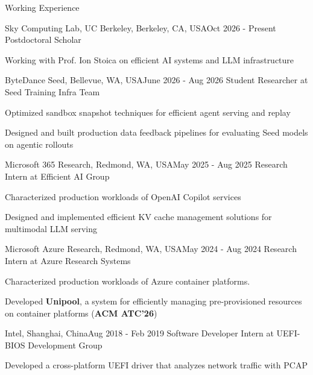 \documentclass{resume} %
\begin{document}
\begin{rSection}{Working Experience}

\begin{rSubsection}{Sky Computing Lab, UC Berkeley, Berkeley, CA, USA}{Oct 2026 - Present}
{Postdoctoral Scholar} \
\item Working with Prof. Ion Stoica on efficient AI systems and LLM infrastructure
\end{rSubsection}

\begin{rSubsection}{ByteDance Seed, Bellevue, WA, USA}{June 2026 - Aug 2026}
{Student Researcher at Seed Training Infra Team} \
\item Optimized sandbox snapshot techniques for efficient agent serving and replay
\item Designed and built production data feedback pipelines for evaluating Seed models on agentic rollouts
\end{rSubsection}

\begin{rSubsection}{Microsoft 365 Research, Redmond, WA, USA}{May 2025 - Aug 2025}
{Research Intern at Efficient AI Group} \
\item Characterized production workloads of OpenAI Copilot services
\item Designed and implemented efficient KV cache management solutions for multimodal LLM serving
\end{rSubsection}

\Needspace{7\baselineskip}
\begin{rSubsection}{Microsoft Azure Research, Redmond, WA, USA}{May 2024 - Aug 2024}
{Research Intern at Azure Research Systems} \
\item Characterized production workloads of Azure container platforms.
\item Developed \textbf{Unipool}, a system for efficiently managing pre-provisioned resources on container platforms (\textbf{ACM ATC'26})
\end{rSubsection}

\begin{rSubsection}{Intel, Shanghai, China}{Aug 2018 - Feb 2019}
{Software Developer Intern at UEFI-BIOS Development Group} \
\item Developed a cross-platform UEFI driver that analyzes network traffic with PCAP
\end{rSubsection}

\end{rSection}
\end{document}
